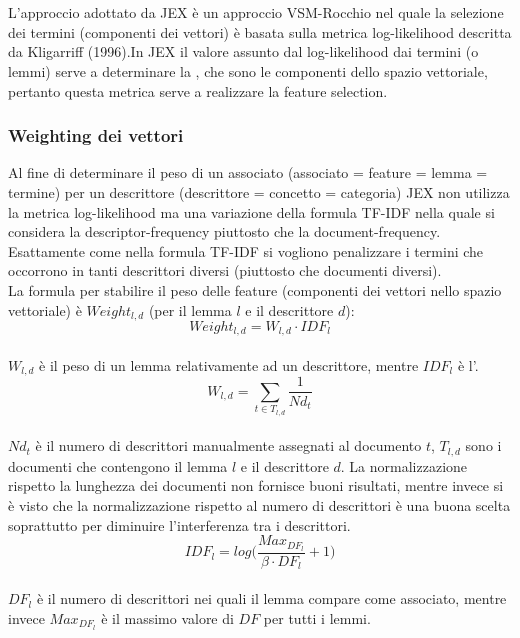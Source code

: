 \documentclass{article}
\theoremstyle{plain}
\theoremstyle{definition}
\begin{document}
\\
\\
L'approccio adottato da JEX è un approccio VSM-Rocchio nel quale la selezione dei termini (componenti dei vettori) è basata sulla metrica log-likelihood descritta da Kligarriff (1996).\footnotemark In JEX il valore assunto dal log-likelihood dai termini (o lemmi) serve a determinare la , che sono le componenti dello spazio vettoriale, pertanto questa metrica serve a realizzare la feature selection.

\subsubsection{Weighting dei vettori}
Al fine di determinare il peso di un associato (associato = feature = lemma = termine) per un descrittore (descrittore = concetto = categoria) JEX non utilizza la metrica log-likelihood ma una variazione della formula TF-IDF nella quale si considera la descriptor-frequency piuttosto che la document-frequency. Esattamente come nella formula TF-IDF si vogliono penalizzare i termini che occorrono in tanti descrittori diversi (piuttosto che documenti diversi).
\\
La formula per stabilire il peso delle feature (componenti dei vettori nello spazio vettoriale) è $Weight_{l,d}$ (per il lemma $l$ e il descrittore $d$):
\\
\[Weight_{l,d}=W_{l,d} \cdot IDF_l \]
\\
$W_{l,d}$ è il peso di un lemma relativamente ad un descrittore, mentre $IDF_l$ è l'.
\\
\[W_{l,d}=\sum_{t \in T_{l,d}} \frac{1}{Nd_t} \]
\\
$Nd_t$ è il numero di descrittori manualmente assegnati al documento $t$, $T_{l,d}$ sono i documenti che contengono il lemma $l$ e il descrittore $d$. La normalizzazione rispetto la lunghezza dei documenti non fornisce buoni risultati, mentre invece si è visto che la normalizzazione rispetto al numero di descrittori è una buona scelta soprattutto per diminuire l'interferenza tra i descrittori.
\\
\[IDF_{l}= log \Bigg(\frac{Max_{DF_{l}}}{\beta \cdot DF_l}+1 \Bigg) \]
\\
$DF_l$ è il numero di descrittori nei quali il lemma compare come associato, mentre invece $Max_{DF_{l}}$ è il massimo valore di $DF$ per tutti i lemmi.
\end{document}
